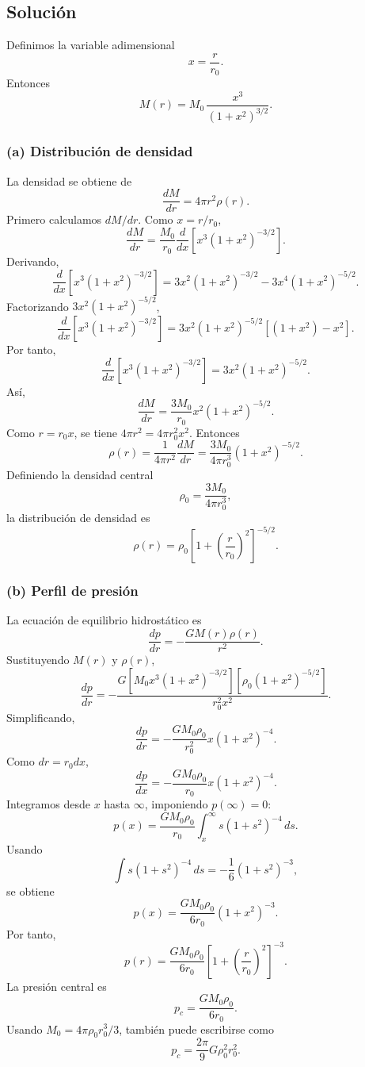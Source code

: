 \documentclass[a4paper]{article}
\begin{document}
\subsection{Solución}
Definimos la variable adimensional
$$
x=\frac{r}{r_0}.
$$
Entonces
$$
M(r)=M_0\,\frac{x^3}{(1+x^2)^{3/2}}.
$$

\subsubsection{(a) Distribución de densidad}

La densidad se obtiene de
$$
\frac{dM}{dr}=4\pi r^2\rho(r).
$$
Primero calculamos $dM/dr$. Como $x=r/r_0$,
$$
\frac{dM}{dr}
=
\frac{M_0}{r_0}
\frac{d}{dx}
\left[
x^3(1+x^2)^{-3/2}
\right].
$$
Derivando,
$$
\frac{d}{dx}
\left[
x^3(1+x^2)^{-3/2}
\right]
=
3x^2(1+x^2)^{-3/2}
-
3x^4(1+x^2)^{-5/2}.
$$
Factorizando $3x^2(1+x^2)^{-5/2}$,
$$
\frac{d}{dx}
\left[
x^3(1+x^2)^{-3/2}
\right]
=
3x^2(1+x^2)^{-5/2}
\left[
(1+x^2)-x^2
\right].
$$
Por tanto,
$$
\frac{d}{dx}
\left[
x^3(1+x^2)^{-3/2}
\right]
=
3x^2(1+x^2)^{-5/2}.
$$
Así,
$$
\frac{dM}{dr}
=
\frac{3M_0}{r_0}
x^2(1+x^2)^{-5/2}.
$$
Como $r=r_0x$, se tiene $4\pi r^2=4\pi r_0^2x^2$. Entonces
$$
\rho(r)
=
\frac{1}{4\pi r^2}\frac{dM}{dr}
=
\frac{3M_0}{4\pi r_0^3}
(1+x^2)^{-5/2}.
$$
Definiendo la densidad central
$$
\rho_0=\frac{3M_0}{4\pi r_0^3},
$$
la distribución de densidad es
$$
\rho(r)=
\rho_0
\left[
1+\left(\frac{r}{r_0}\right)^2
\right]^{-5/2}.
$$



\subsubsection{(b) Perfil de presión}

La ecuación de equilibrio hidrostático es
$$
\frac{dp}{dr}
=
-\frac{G M(r)\rho(r)}{r^2}.
$$
Sustituyendo $M(r)$ y $\rho(r)$,
$$
\frac{dp}{dr}
=
-
\frac{
G
\left[
M_0 x^3(1+x^2)^{-3/2}
\right]
\left[
\rho_0(1+x^2)^{-5/2}
\right]
}
{r_0^2x^2}.
$$
Simplificando,
$$
\frac{dp}{dr}
=
-
\frac{G M_0\rho_0}{r_0^2}
x(1+x^2)^{-4}.
$$
Como $dr=r_0dx$,
$$
\frac{dp}{dx}
=
-
\frac{G M_0\rho_0}{r_0}
x(1+x^2)^{-4}.
$$
Integramos desde $x$ hasta $\infty$, imponiendo $p(\infty)=0$:
$$
p(x)
=
\frac{G M_0\rho_0}{r_0}
\int_x^\infty
s(1+s^2)^{-4}\,ds.
$$
Usando
$$
\int s(1+s^2)^{-4}\,ds
=
-\frac{1}{6}(1+s^2)^{-3},
$$
se obtiene
$$
p(x)
=
\frac{G M_0\rho_0}{6r_0}
(1+x^2)^{-3}.
$$
Por tanto,
$$
p(r)=
\frac{G M_0\rho_0}{6r_0}
\left[
1+\left(\frac{r}{r_0}\right)^2
\right]^{-3}.
$$
La presión central es
$$
p_c=
\frac{G M_0\rho_0}{6r_0}.
$$
Usando $M_0=4\pi\rho_0r_0^3/3$, también puede escribirse como
$$
p_c=
\frac{2\pi}{9}G\rho_0^2r_0^2.
$$
\end{document}

